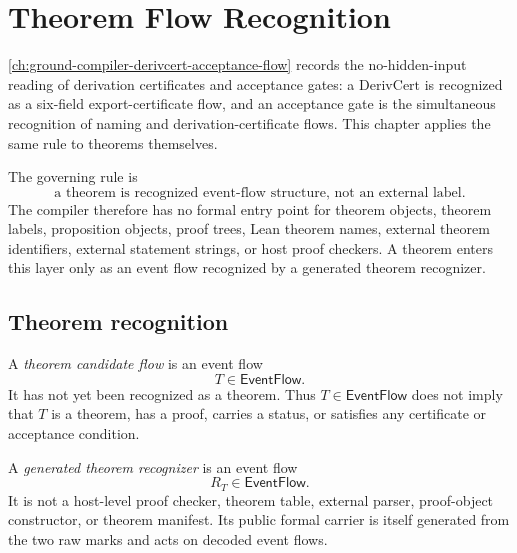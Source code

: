 \chapter{Theorem Flow Recognition}
\label{ch:ground-compiler-theorem-flow-recognition}

\autoref{ch:ground-compiler-derivcert-acceptance-flow} records the no-hidden-input reading of derivation certificates and acceptance gates: a $\mathrm{DerivCert}$ is recognized as a six-field export-certificate flow, and an acceptance gate is the simultaneous recognition of naming and derivation-certificate flows. This chapter applies the same rule to theorems themselves.

The governing rule is
$$
  \boxed{\text{a theorem is recognized event-flow structure, not an external label}.}
$$
The compiler therefore has no formal entry point for theorem objects, theorem labels, proposition objects, proof trees, Lean theorem names, external theorem identifiers, external statement strings, or host proof checkers. A theorem enters this layer only as an event flow recognized by a generated theorem recognizer.

\section{Theorem recognition}
\label{sec:theorem-generated-recognition}

\begin{definition}
\label{def:theorem-generated-candidate-flow}
A \emph{theorem candidate flow} is an event flow
$$
  T \in \mathsf{EventFlow}.
$$
It has not yet been recognized as a theorem. Thus $T \in \mathsf{EventFlow}$ does not imply that $T$ is a theorem, has a proof, carries a status, or satisfies any certificate or acceptance condition.
\end{definition}

\begin{definition}
\label{def:theorem-generated-recognizer}
A \emph{generated theorem recognizer} is an event flow
$$
  R_T \in \mathsf{EventFlow}.
$$
It is not a host-level proof checker, theorem table, external parser, proof-object constructor, or theorem manifest. Its public formal carrier is itself generated from the two raw marks and acts on decoded event flows.
\end{definition}

